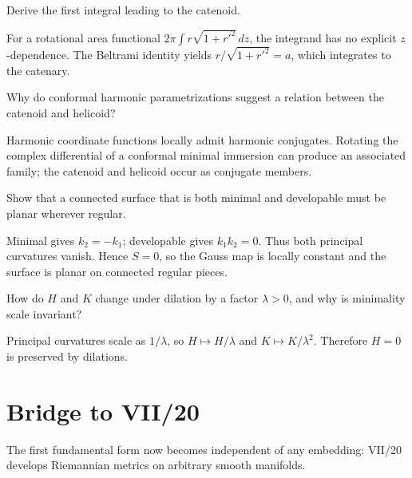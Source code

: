 \begin{problem}\label{prob:vii19-ch02}
Derive the first integral leading to the catenoid.
\end{problem}
\begin{solution}
For a rotational area functional \(2\pi\int r\sqrt{1+r'^2}\,dz\), the integrand has no explicit \(z\)-dependence. The Beltrami identity yields \(r/\sqrt{1+r'^2}=a\), which integrates to the catenary.
\end{solution}

\begin{problem}\label{prob:vii19-ch03}
Why do conformal harmonic parametrizations suggest a relation between the catenoid and helicoid?
\end{problem}
\begin{solution}
Harmonic coordinate functions locally admit harmonic conjugates. Rotating the complex differential of a conformal minimal immersion can produce an associated family; the catenoid and helicoid occur as conjugate members.
\end{solution}

\begin{problem}\label{prob:vii19-ch04}
Show that a connected surface that is both minimal and developable must be planar wherever regular.
\end{problem}
\begin{solution}
Minimal gives \(k_2=-k_1\); developable gives \(k_1k_2=0\). Thus both principal curvatures vanish. Hence \(S=0\), so the Gauss map is locally constant and the surface is planar on connected regular pieces.
\end{solution}

\begin{problem}\label{prob:vii19-ch05}
How do \(H\) and \(K\) change under dilation by a factor \(\lambda>0\), and why is minimality scale invariant?
\end{problem}
\begin{solution}
Principal curvatures scale as \(1/\lambda\), so \(H\mapsto H/\lambda\) and \(K\mapsto K/\lambda^2\). Therefore \(H=0\) is preserved by dilations.
\end{solution}

\section*{Bridge to VII/20}
The first fundamental form now becomes independent of any embedding: VII/20 develops Riemannian metrics on arbitrary smooth manifolds.
